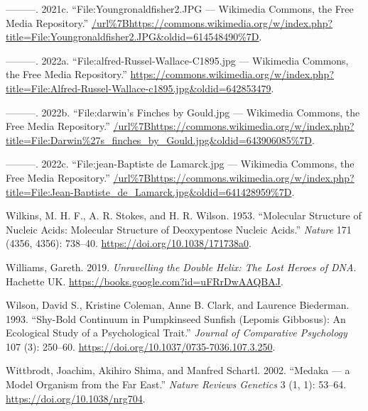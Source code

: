 \documentclass[
]{book}
\newlength{\cslhangindent}
\newlength{\cslentryspacingunit} %
\newenvironment{CSLReferences}[2] %
 {%
  \setlength{\parindent}{0pt}
  \ifodd #1
  \let\oldpar\par
  \def\par{\hangindent=\cslhangindent\oldpar}
  \fi
  \setlength{\parskip}{#2\cslentryspacingunit}
 }%
 {}
\begin{document}
\begin{CSLReferences}{1}{0}
\leavevmode{}%
---------. 2021c. {``File:Youngronaldfisher2.JPG --- Wikimedia Commons{,} the Free Media Repository.''} \url{/url\%7Bhttps://commons.wikimedia.org/w/index.php?title=File:Youngronaldfisher2.JPG\&oldid=614548490\%7D}.

\leavevmode{}%
---------. 2022a. {``File:alfred-Russel-Wallace-C1895.jpg --- Wikimedia Commons{,} the Free Media Repository.''} \url{https://commons.wikimedia.org/w/index.php?title=File:Alfred-Russel-Wallace-c1895.jpg\&oldid=642853479}.

\leavevmode{}%
---------. 2022b. {``File:darwin's Finches by Gould.jpg --- Wikimedia Commons{,} the Free Media Repository.''} \url{/url\%7Bhttps://commons.wikimedia.org/w/index.php?title=File:Darwin\%27s_finches_by_Gould.jpg\&oldid=643906085\%7D}.

\leavevmode{}%
---------. 2022c. {``File:jean-Baptiste de Lamarck.jpg --- Wikimedia Commons{,} the Free Media Repository.''} \url{/url\%7Bhttps://commons.wikimedia.org/w/index.php?title=File:Jean-Baptiste_de_Lamarck.jpg\&oldid=641428959\%7D}.

\leavevmode{}%
Wilkins, M. H. F., A. R. Stokes, and H. R. Wilson. 1953. {``Molecular {Structure} of {Nucleic Acids}: {Molecular Structure} of {Deoxypentose Nucleic Acids}.''} \emph{Nature} 171 (4356, 4356): 738--40. \url{https://doi.org/10.1038/171738a0}.

\leavevmode{}%
Williams, Gareth. 2019. \emph{Unravelling the {Double Helix}: {The Lost Heroes} of {DNA}}. {Hachette UK}. \url{https://books.google.com?id=uFRrDwAAQBAJ}.

\leavevmode{}%
Wilson, David S., Kristine Coleman, Anne B. Clark, and Laurence Biederman. 1993. {``Shy-Bold Continuum in Pumpkinseed Sunfish ({Lepomis} Gibbosus): {An} Ecological Study of a Psychological Trait.''} \emph{Journal of Comparative Psychology} 107 (3): 250--60. \url{https://doi.org/10.1037/0735-7036.107.3.250}.

\leavevmode{}%
Wittbrodt, Joachim, Akihiro Shima, and Manfred Schartl. 2002. {``Medaka --- a Model Organism from the Far East.''} \emph{Nature Reviews Genetics} 3 (1, 1): 53--64. \url{https://doi.org/10.1038/nrg704}.


\end{CSLReferences}
\end{document}
